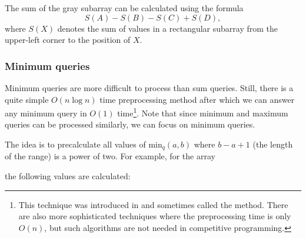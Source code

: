 The sum of the gray subarray can be calculated
using the formula
\[S(A) - S(B) - S(C) + S(D),\]
where $S(X)$ denotes the sum of values
in a rectangular
subarray from the upper-left corner
to the position of $X$.

\subsubsection{Minimum queries}


Minimum queries are more difficult to process
than sum queries.
Still, there is a quite simple 
$O(n \log n)$ time preprocessing
method after which we can answer any minimum
query in $O(1)$ time\footnote{This technique
was introduced in \cite{ben00} and sometimes
called the  method.
There are also more sophisticated techniques \cite{fis06} where
the preprocessing time is only $O(n)$, but such algorithms
are not needed in competitive programming.}.
Note that since minimum and maximum queries can
be processed similarly,
we can focus on minimum queries.

The idea is to precalculate all values of
$\textrm{min}_q(a,b)$ where
$b-a+1$ (the length of the range) is a power of two.
For example, for the array

\begin{center}
\end{center}
the following values are calculated:

